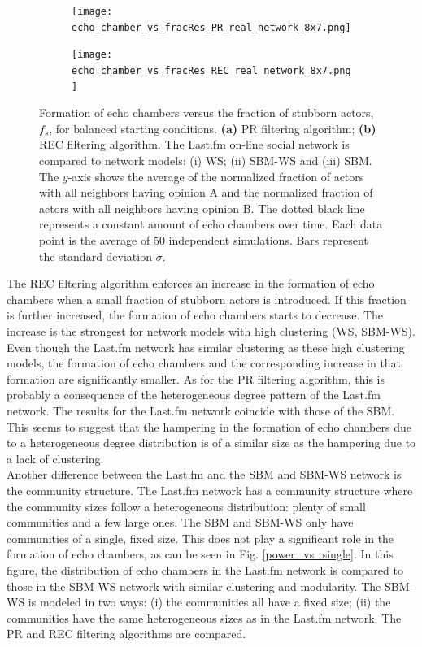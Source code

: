 \documentclass[11 pt , letterpaper , twoside , openright]{book}
\begin{document}
\begin{figure}[H]
  \begin{subfigure}[b]{0.49\textwidth}
    \caption{}
  	\texttt{[image: echo\_chamber\_vs\_fracRes\_PR\_real\_network\_8x7.png]}
    \label{pr_real}
  \end{subfigure}
  \begin{subfigure}[b]{0.49\textwidth}
    \caption{}
  	\texttt{[image: echo\_chamber\_vs\_fracRes\_REC\_real\_network\_8x7.png]}
    \label{rec_real}
  \end{subfigure}
  \captionsetup{format=plain}
  \caption[Formation of echo chambers versus fraction of stubborn actors for balanced starting conditions. The PR and REC filtering algorithms are compared. The Last.fm on-line social network is compared to network models.]{Formation of echo chambers versus the fraction of stubborn actors, $f_s$, for balanced starting conditions. \textbf{(a)} PR filtering algorithm; \textbf{(b)} REC filtering algorithm. The Last.fm on-line social network is compared to network models: (i) WS; (ii) SBM-WS and (iii) SBM. The $y$-axis shows the average of the normalized fraction of actors with all neighbors having opinion A and the normalized fraction of actors with all neighbors having opinion B. The dotted black line represents a constant amount of echo chambers over time. Each data point is the average of $50$ independent simulations. Bars represent the standard deviation $\sigma$.}
\label{echo_vs_fracRes_real}
\end{figure}
\newpage
\noindent
The REC filtering algorithm enforces an increase in the formation of echo chambers when a small fraction of stubborn actors is introduced. If this fraction is further increased, the formation of echo chambers starts to decrease. The increase is the strongest for network models with high clustering (WS, SBM-WS). Even though the Last.fm network has similar clustering as these high clustering models, the formation of echo chambers and the corresponding increase in that formation are significantly smaller. As for the PR filtering algorithm, this is probably a consequence of the heterogeneous degree pattern of the Last.fm network. The results for the Last.fm network coincide with those of the SBM. This seems to suggest that the hampering in the formation of echo chambers due to a heterogeneous degree distribution is of a similar size as the hampering due to a lack of clustering. \\
\newline
Another difference between the Last.fm and the SBM and SBM-WS network is the community structure. The Last.fm network has a community structure where the community sizes follow a heterogeneous distribution: plenty of small communities and a few large ones. The SBM and SBM-WS only have communities of a single, fixed size. This does not play a significant role in the formation of echo chambers, as can be seen in Fig. \ref{power_vs_single}. In this figure, the distribution of echo chambers in the Last.fm network is compared to those in the SBM-WS network with similar clustering and modularity. The SBM-WS is modeled in two ways: (i) the communities all have a fixed size; (ii) the communities have the same heterogeneous sizes as in the Last.fm network. The PR and REC filtering algorithms are compared.
\end{document}
